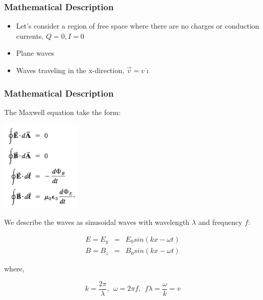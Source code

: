 \documentclass[]{beamer}
\begin{document}


\begin{frame}
\frametitle{Mathematical Description}

\begin{itemize}
\item Let's consider a region of free space where there are no charges or conduction currents, $Q=0, I=0$
\pause 
\item Plane waves
\pause
\item Waves traveling in the x-direction, $\vec{v}=v\hat{\imath}$
\end{itemize}


  \end{frame}





\begin{frame}
\frametitle{Mathematical Description}


The Maxwell equation take the form:


 \begin{center}
  \includegraphics[height=1.7in]{images5/Maxwell_EQ2.jpg}
\end{center}


  \end{frame}






\begin{frame}


We describe the waves as sinusoidal waves with wavelength $\lambda$ and frequency $f$:
\pause
\vspace{3mm}


\begin{eqnarray}
E=E_y&=&E_0sin(kx-\omega t)\\
B=B_z&=&B_0sin(kx-\omega t)
\end{eqnarray}
\pause
\vspace{3mm}

where,
\pause



\begin{equation*}
k=\frac{2\pi}{\lambda},\ \ \omega=2\pi f,\ \ f\lambda=\frac{\omega}{k}=v
\end{equation*}


  \end{frame}
\end{document}
